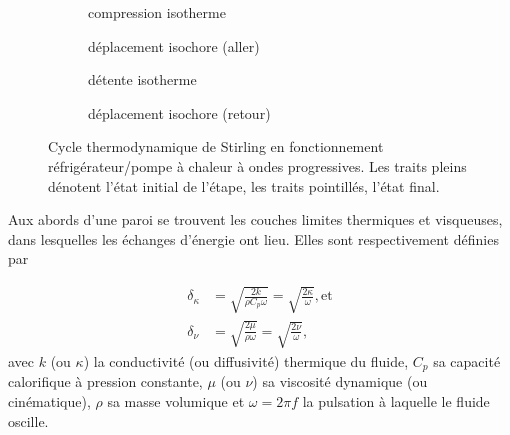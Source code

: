 \begin{figure}[!ht]
	\centering
	\begin{subfigure}{.47\textwidth}
		\centering
		
		\caption{compression isotherme}
		\label{fig:CycleStirling_Comp}
	\end{subfigure}
	\begin{subfigure}{.47\textwidth}
		\centering
		
		\caption{déplacement isochore (aller)}
		\label{fig:CycleStirling_DépIsoch1}
	\end{subfigure}
	\begin{subfigure}{.47\textwidth}
		\centering
		
		\caption{détente isotherme}
		\label{fig:CycleStirling_Détente}
	\end{subfigure}
	\begin{subfigure}{.47\textwidth}
		\centering
		
		\caption{déplacement isochore (retour)}
		\label{fig:CycleStirling_DépIsoch2}
	\end{subfigure}	
	\caption[Cycle de Stirling des machines à ondes progressives]{Cycle thermodynamique de Stirling en fonctionnement réfrigérateur/pompe à chaleur à ondes progressives. Les traits pleins dénotent l'état initial de l'étape, les traits pointillés, l'état final.}
	\label{fig:CycleStirling}
\end{figure} %



Aux abords d'une paroi se trouvent les couches limites thermiques et visqueuses, dans lesquelles les échanges d'énergie ont lieu. Elles sont respectivement définies par

\begin{subequations}
	\begin{align}
		\delta_{\kappa} &= \sqrt{\frac{2 k}{\rho C_p \omega}} = \sqrt{\frac{2 \kappa}{\omega}}, \text{et}	\label{eq:CouchesLimites_Thermique}\\
		\delta_{\nu} &= \sqrt{\frac{2 \mu}{\rho \omega}} = \sqrt{\frac{2 \nu}{\omega}},	\label{eq:CouchesLimites_Visqueuse}
	\end{align}
	\label{eq:CouchesLimites}%
\end{subequations}
avec $k$ (ou $\kappa$) la conductivité (ou diffusivité) thermique du fluide, $C_p$ sa capacité calorifique à pression constante, $\mu$ (ou $\nu$) sa viscosité dynamique (ou cinématique), $\rho$ sa masse volumique et $\omega = 2\pi f$ la pulsation à laquelle le fluide oscille.

